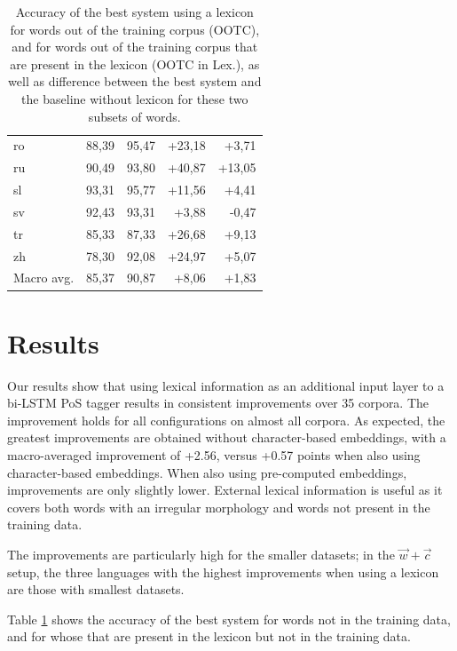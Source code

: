 \documentclass[11pt,a4paper]{article}
\begin{document}
\begin{table}[th]
\begin{tabular}{lrrrr}
ro & 88,39 & 95,47 & +23,18 & +3,71\\
ru & 90,49 & 93,80 & +40,87 & +13,05\\
sl & 93,31 & 95,77 & +11,56 & +4,41\\
sv & 92,43 & 93,31 & +3,88 & -0,47\\
tr & 85,33 & 87,33 & +26,68 & +9,13\\
zh & 78,30 & 92,08 & +24,97 & +5,07\\
\midrule
Macro avg. & 85,37 & 90,87 & +8,06 & +1,83\\
\bottomrule
\end{tabular}
\caption{Accuracy of the best system using a lexicon for words out of the training corpus (OOTC), and for words out of the training corpus that are present in the lexicon (OOTC in Lex.), as well as difference between the best system and the baseline without lexicon for these two subsets of words. \label{tbl:acc_oov}}
\end{table}


\section{Results}

Our results show that using lexical information as an additional input layer to a bi-LSTM PoS tagger results in
consistent improvements over 35 corpora. The improvement holds for all configurations on almost all corpora. As
expected, the greatest improvements are obtained without character-based embeddings, with a macro-averaged improvement
of +2.56, versus +0.57 points when also using character-based embeddings. When also using pre-computed embeddings,
improvements are only slightly lower. External lexical information is useful as it covers both words with an irregular
morphology and words not present in the training data.

The improvements are particularly high for the smaller datasets; in the $\vec{w}+\vec{c}$ setup, the three
languages with the highest improvements when using a lexicon are those with smallest datasets.

Table \ref{tbl:acc_oov} shows the accuracy of the best system for words not in the training data, and for whose that are present in the lexicon but not in the training data. 

\end{document}
